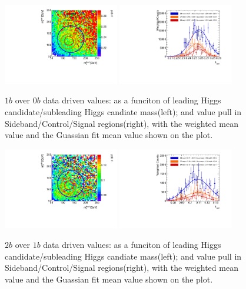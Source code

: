 \begin{figure}[htbp!]
\begin{center}
\includegraphics[width=0.45\textwidth,angle=-90]{figures/boosted/AppendixMuqcdstudy/OneTag_Incl_mH0H1.pdf}
\includegraphics[width=0.45\textwidth,angle=-90]{figures/boosted/AppendixMuqcdstudy/OneTag_Incl_mH0H1_pull.pdf}
\caption{$1b$ over $0b$ data driven \muqcd values: \muqcd as a funciton of leading Higgs candidate/subleading Higgs candiate mass(left); and \muqcd value pull in Sideband/Control/Signal regions(right), with the weighted mean value and the Guassian fit mean value shown on the plot.}
\label{fig:app-muqcd-1b}
\end{center}
\end{figure}

\begin{figure}[htbp!]
\begin{center}
\includegraphics[width=0.45\textwidth,angle=-90]{figures/boosted/AppendixMuqcdstudy/TwoTag_Incl_mH0H1.pdf}
\includegraphics[width=0.45\textwidth,angle=-90]{figures/boosted/AppendixMuqcdstudy/TwoTag_Incl_mH0H1_pull.pdf}
\caption{$2b$ over $1b$ data driven \muqcd values: \muqcd as a funciton of leading Higgs candidate/subleading Higgs candiate mass(left); and \muqcd value pull in Sideband/Control/Signal regions(right), with the weighted mean value and the Guassian fit mean value shown on the plot.}
\label{fig:app-muqcd-2b}
\end{center}
\end{figure}

